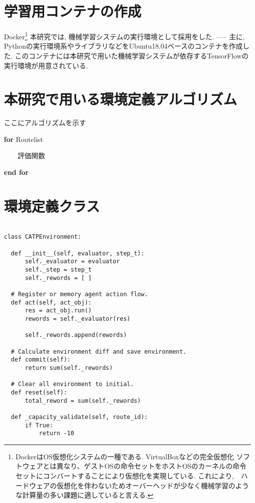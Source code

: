 \section{学習用コンテナの作成}

Docker\footnote{DockerはOS仮想化システムの一種である. VirtualBoxなどの完全仮想化
ソフトウェアとは異なり、ゲストOSの命令セットをホストOSのカーネルの命令セットにコンバートすることにより仮想化を実現している.
これにより,　ハードウェアの仮想化を伴わないためオーバーヘッドが少なく機械学習のような計算量の多い課題に適していると言える.}
本研究では, 機械学習システムの実行環境として採用をした.
-----
主に, Pythonの実行環境系やライブラリなどをUbuntu18.04ベースのコンテナを作成した.
このコンテナには本研究で用いた機械学習システムが依存するTensorFlowの実行環境が用意されている.

\section{本研究で用いる環境定義アルゴリズム}

ここにアルゴリズムを示す

\textbf{for} Routelist

\ \ \ \ 評価関数

\textbf{end for}


\section{環境定義クラス}

\begin{lstlisting}[caption = 環境を構築するクラス, label = program1]

class CATPEnvironment:

  def __init__(self, evaluator, step_t):
      self._evaluator = evaluator
      self._step = step_t
      self._rewords = [ ]

  # Register or memory agent action flow.
  def act(self, act_obj):
      res = act_obj.run()
      rewords = self._evaluator(res)

      self._rewords.append(rewords)
  
  # Calculate environment diff and save environment.
  def commit(self):
      return sum(self._rewords)
  
  # Clear all environment to initial.
  def reset(self):
      total_reword = sum(self._rewords)

  def _capacity_validate(self, route_id):
      if True:
          return -10
\end{lstlisting}
  




